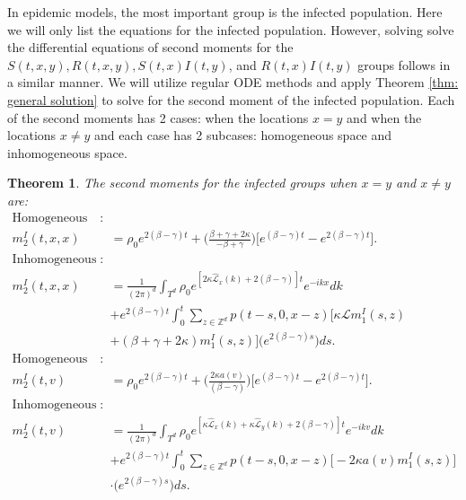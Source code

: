 \documentclass[sn-basic]{sn-jnl}%
\theoremstyle{thmstyleone}%
\newtheorem{theorem}{Theorem}%
\theoremstyle{thmstyletwo}%
\theoremstyle{thmstylethree}%
\numberwithin{equation}{theorem}
\begin{document}
In epidemic models, the most important group is the infected population. Here we will only list the equations for the infected population. However, solving solve the differential equations of second moments for the $S(t,x,y), R(t,x,y), S(t,x)I(t,y)$, and $R(t,x)I(t,y)$ groups follows in a similar manner. We will utilize regular ODE methods and apply Theorem \ref{thm: general solution} to solve for the second moment of the infected population. Each of the second moments has 2 cases: when the locations $x=y$ and when the locations $x \neq y$ and each case has 2 subcases: homogeneous space and inhomogeneous space.

\begin{theorem}\label{thm: 2nd moment}
The second moments for the infected groups when $x=y$ and $x \neq y$ are:
\begin{align*}
\text{Homogeneous space}:\\
m_{2}^{I}(t,x,x) &= \rho_{0} e^{\displaystyle 2 (\beta-\gamma)t} + \Big(\displaystyle \frac{\beta + \gamma + 2\kappa}{-\beta + \gamma}\Big) \Big[ e^{\displaystyle (\beta-\gamma)t} - e^{\displaystyle 2(\beta-\gamma)t} \Big].\\
\text{Inhomogeneous space}:\\
m_{2}^{I}(t,x,x) &= \displaystyle \frac{1}{(2 \pi)^d} \int_{T^d} \rho_{0} e^{\displaystyle [2\kappa \hat{\mathcal{L}}_{x}(k) + 2(\beta-\gamma)]t} e^{\displaystyle -ikx}dk\\
&+ e^{\displaystyle 2(\beta-\gamma)t} \displaystyle\int_{0}^{t} \sum\limits_{z \in \mathbb{Z}^d} p(t-s,0,x-z)\Big[\kappa \mathcal{L}m_{1}^{I}(s,z)\\
&+(\beta+\gamma+2\kappa)m_{1}^{I}(s,z)\Big]\Big(e^{\displaystyle 2(\beta-\gamma)s}\Big)ds.\\
\text{Homogeneous space}:\\
m_{2}^{I}(t,v) &=  \rho_{0} e^{\displaystyle 2 (\beta-\gamma)t} + \Big(\displaystyle \frac{2 \kappa a(v)}{(\beta-\gamma)}\Big) \Big[ e^{\displaystyle (\beta-\gamma)t} - e^{\displaystyle 2 (\beta - \gamma)t} \Big].\\
\text{Inhomogeneous space}:\\
m_{2}^{I}(t,v) &=\displaystyle \frac{1}{(2\pi)^d} \int_{T^d} \rho_{0} e^{\displaystyle [\kappa \hat{\mathcal{L}}_{x}(k) + \kappa \hat{\mathcal{L}}_{y}(k) + 2 (\beta- \gamma)]t} e^{\displaystyle -ikv}dk\\
&+e^{\displaystyle 2(\beta-\gamma)t} \displaystyle\int_{0}^{t} \sum\limits_{z \in \mathbb{Z}^d} p(t-s,0,x-z)\Big[-2 \kappa a(v) m_{1}^{I}(s,z)\Big]\\
&\cdot \Big(e^{\displaystyle 2(\beta-\gamma)s}\Big)ds.
\end{align*}
\end{theorem}
\end{document}
